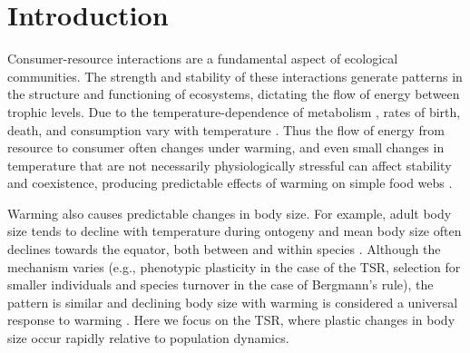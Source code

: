 \documentclass[11pt]{article}
\begin{document}
\newpage{}

\section*{Introduction}



Consumer-resource interactions are a fundamental aspect of ecological communities.
The strength and stability of these interactions generate patterns in the structure and functioning of ecosystems, dictating the flow of energy between trophic levels. 
Due to the temperature-dependence of metabolism \citep{Gillooly2001}, rates of birth, death, and consumption vary with temperature \citep{Savage2004,Gilbert2014}.
Thus the flow of energy from resource to consumer often changes under warming, and even small changes in temperature that are not necessarily physiologically stressful can affect stability and coexistence, producing predictable effects of warming on simple food webs \citep{Gilbert2014,Vasseur2005,OConnor2011,Rall2010}. 

Warming also causes predictable changes in body size.
For example, adult body size tends to decline with temperature during ontogeny \citep[the temperature-size rule, TSR; reviewed in][]{Atkinson1994} and mean body size often declines towards the equator, both between and within species \citep[Bergmann's rule; reviewed in][]{Blackburn1999}.
Although the mechanism varies (e.g., phenotypic plasticity in the case of the TSR, selection for smaller individuals and species turnover in the case of Bergmann's rule), the pattern is similar and declining body size with warming is considered a universal response to warming \citep{Daufresne2009,Gardner2011}. 
Here we focus on the TSR, where plastic changes in body size occur rapidly relative to population dynamics.
\end{document}
